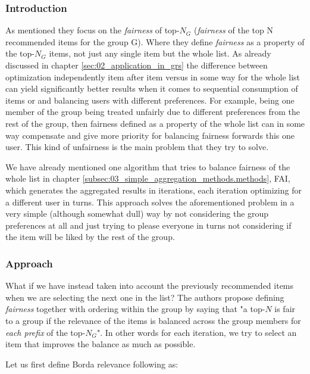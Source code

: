\subsubsection{Introduction}

As mentioned they focus on the \textit{fairness} of top-$N_G$ (\textit{fairness} of the top N recommended items for the group G). Where they define \textit{fairness} as a property of the top-$N_G$ items, not just any single item but the whole list. As already discussed in chapter \ref{sec:02_application_in_grs} the difference between optimization independently item after item versus in some way for the whole list can yield significantly better results when it comes to sequential consumption of items or and balancing users with different preferences. For example, being one member of the group being treated unfairly due to different preferences from the rest of the group, then fairness defined as a property of the whole list can in some way compensate and give more priority for balancing fairness forwards this one user. This kind of unfairness is the main problem that they try to solve.

We have already mentioned one algorithm that tries to balance fairness of the whole list in chapter \ref{subsec:03_simple_aggregation_methods.methods}, FAI, which generates the aggregated results in iterations, each iteration optimizing for a different user in turns. This approach solves the aforementioned problem in a very simple (although somewhat dull) way by not considering the group preferences at all and just trying to please everyone in turns not considering if the item will be liked by the rest of the group.


\subsubsection{Approach}

What if we have instead taken into account the previously recommended items when we are selecting the next one in the list? The authors propose defining \textit{fairness} together with ordering within the group by saying that "a top-$N$ is fair to a group if the relevance of the items is balanced across the group members for \textit{each prefix} of the top-$N_G$". In other words for each iteration, we try to select an item that improves the balance as much as possible.

Let us first define Borda relevance following \cite{xiao_2017_fairness_aware_g_rec} as:


